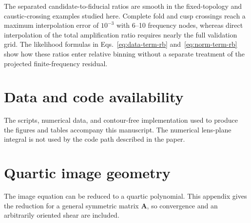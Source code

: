 \documentclass[aps,prd,twocolumn,nofootinbib,superscriptaddress,floatfix]{revtex4-2}
\newcommand{\bA}{\bm{A}}
\begin{document}
The separated candidate-to-fiducial ratios are smooth in the fixed-topology
and caustic-crossing examples studied here.  Complete fold and cusp crossings
reach a maximum interpolation error of $10^{-3}$ with 6--10 frequency nodes,
whereas direct interpolation of the total amplification ratio requires nearly
the full validation grid.  The likelihood formulas in
Eqs.~\eqref{eq:data-term-rb} and~\eqref{eq:norm-term-rb} show how these ratios
enter relative binning without a separate treatment of the projected
finite-frequency residual.

\section*{Data and code availability}

The scripts, numerical data, and contour-free implementation used to produce
the figures and tables accompany this manuscript.  The numerical lens-plane
integral is not used by the code path described in the paper.

\appendix

\section{Quartic image geometry}
\label{app:quartic}

The image equation can be reduced to a quartic polynomial.  This appendix
gives the reduction for a general symmetric matrix $\bA$, so convergence and
an arbitrarily oriented shear are included.
\end{document}
